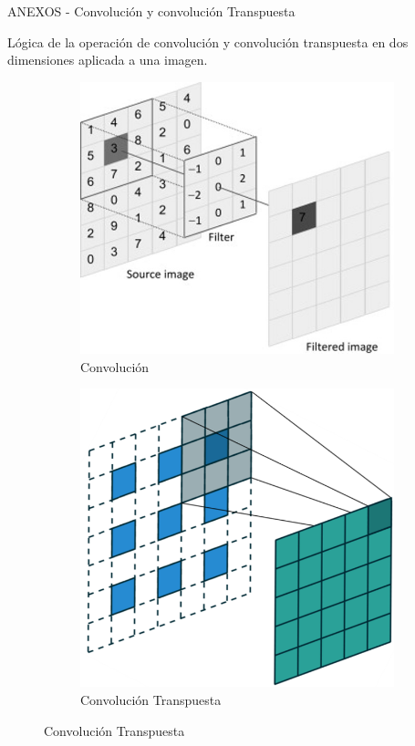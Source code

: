 \documentclass[12pt,aspectratio=169]{beamer}
\begin{document}
\begin{frame}{ANEXOS -  Convolución y convolución Transpuesta}

    Lógica de la operación de convolución y convolución transpuesta en dos dimensiones aplicada a una imagen.

    \begin{figure}
        \begin{subfigure}{0.45\textwidth}
            \centering
            \includegraphics[scale=0.325]{figs/conv_2d.jpg}
            \caption{Convolución}
        \end{subfigure}
        \begin{subfigure}{0.45\textwidth}
            \centering
            \includegraphics[scale=0.30]{figs/trans_conv.PNG}
            \caption{Convolución Transpuesta}
        \end{subfigure}
    \end{figure}

\end{frame}
\end{document}
